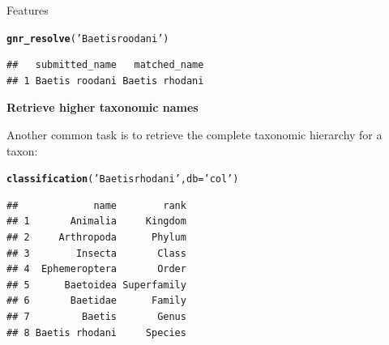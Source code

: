 \documentclass[final,t]{beamer}\usepackage[]{graphicx}\usepackage[]{color}
\makeatletter
\newcommand{\hlstr}[1]{\textcolor[rgb]{0.192,0.494,0.8}{#1}}%
\newcommand{\hlstd}[1]{\textcolor[rgb]{0.345,0.345,0.345}{#1}}%
\newcommand{\hlkwc}[1]{\textcolor[rgb]{0.333,0.667,0.333}{#1}}%
\newcommand{\hlkwd}[1]{\textcolor[rgb]{0.737,0.353,0.396}{\textbf{#1}}}%
\newenvironment{kframe}{%
 \def\at@end@of@kframe{}%
 \ifinner\ifhmode%
  \def\at@end@of@kframe{\end{minipage}}%
  \begin{minipage}{\columnwidth}%
 \fi\fi%
 \def\FrameCommand##1{\hskip\@totalleftmargin \hskip-\fboxsep
 \colorbox{shadecolor}{##1}\hskip-\fboxsep
     \hskip-\linewidth \hskip-\@totalleftmargin \hskip\columnwidth}%
 \MakeFramed {\advance\hsize-\width
   \@totalleftmargin\z@ \linewidth\hsize
   \@setminipage}}%
 {\par\unskip\endMakeFramed%
 \at@end@of@kframe}
\newenvironment{knitrout}{}{} %
\renewenvironment{knitrout}{}{\vspace{-1.8em}}
\makeatother
\begin{document}
\begin{frame}[fragile]
\begin{columns}[t]
\begin{column}{.49\linewidth}
\begin{block}{Features}
\begin{knitrout}\footnotesize
{}\color{fgcolor}\begin{kframe}
\begin{alltt}
\hlkwd{gnr_resolve}\hlstd{(}\hlstr{'Baetis roodani'}\hlstd{)}
\end{alltt}
\end{kframe}
\end{knitrout}
\begin{knitrout}\footnotesize
{}\color{fgcolor}\begin{kframe}
\begin{verbatim}
##   submitted_name   matched_name
## 1 Baetis roodani Baetis rhodani
\end{verbatim}
\end{kframe}
\end{knitrout}
\vspace{2em}
					
\textcolor{i6bluedark}{\textbf{\large Retrieve higher taxonomic names}} 
        \vspace{0.5em}
        \par
        \begingroup
        \leftskip=2cm
        \noindent 
          Another common task is to retrieve the complete taxonomic hierarchy for a taxon:
        \par
        \endgroup

\begin{knitrout}\footnotesize
{}\color{fgcolor}\begin{kframe}
\begin{alltt}
\hlkwd{classification}\hlstd{(}\hlstr{'Baetis rhodani'}\hlstd{,} \hlkwc{db} \hlstd{=} \hlstr{'col'}\hlstd{)}
\end{alltt}
\end{kframe}
\end{knitrout}
\begin{knitrout}\footnotesize
{}\color{fgcolor}\begin{kframe}
\begin{verbatim}
##             name        rank
## 1       Animalia     Kingdom
## 2     Arthropoda      Phylum
## 3        Insecta       Class
## 4  Ephemeroptera       Order
## 5      Baetoidea Superfamily
## 6       Baetidae      Family
## 7         Baetis       Genus
## 8 Baetis rhodani     Species
\end{verbatim}
\end{kframe}
\end{knitrout}
\vspace{2em}


\end{block}
\end{column}
\end{columns}
\end{frame}
\end{document}
